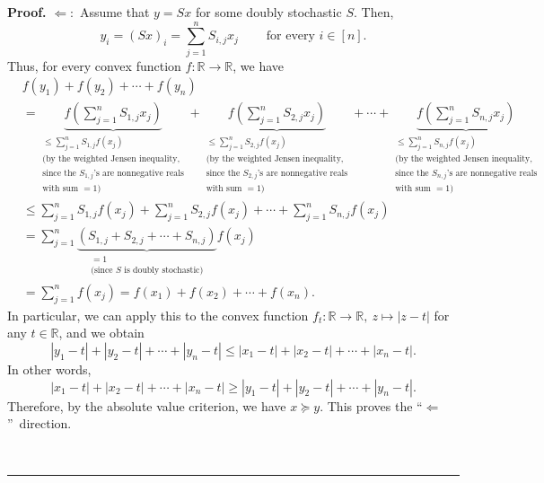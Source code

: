 \documentclass[numbers=enddot,12pt,final,onecolumn,notitlepage]{scrartcl}%
\numberwithin{exer}{subsection}
\theoremstyle{definition}
\newenvironment{proof}[1][Proof]{\noindent\textbf{#1.} }{\ \rule{0.5em}{0.5em}}
\let\sumnonlimits\sum
\renewcommand{\sum}{\sumnonlimits\limits}
\begin{document}
\begin{proof}
$\Longleftarrow:$ Assume that $y=Sx$ for some doubly stochastic $S$. Then,%
\[
y_{i}=\left(  Sx\right)  _{i}=\sum_{j=1}^{n}S_{i,j}x_{j}%
\ \ \ \ \ \ \ \ \ \ \text{for every }i\in\left[  n\right]  .
\]
Thus, for every convex function $f:\mathbb{R}\rightarrow\mathbb{R}$, we have%
\begin{align*}
& f\left(  y_{1}\right)  +f\left(  y_{2}\right)  +\cdots+f\left(
y_{n}\right)  \\
& =\underbrace{f\left(  \sum_{j=1}^{n}S_{1,j}x_{j}\right)  }_{\substack{\leq
\sum_{j=1}^{n}S_{1,j}f\left(  x_{j}\right)  \\\text{(by the weighted Jensen
inequality,}\\\text{since the }S_{1,j}\text{'s are nonnegative reals}%
\\\text{with sum }=1\text{)}}}+\underbrace{f\left(  \sum_{j=1}^{n}S_{2,j}%
x_{j}\right)  }_{\substack{\leq\sum_{j=1}^{n}S_{2,j}f\left(  x_{j}\right)
\\\text{(by the weighted Jensen inequality,}\\\text{since the }S_{2,j}\text{'s
are nonnegative reals}\\\text{with sum }=1\text{)}}}+\cdots
+\underbrace{f\left(  \sum_{j=1}^{n}S_{n,j}x_{j}\right)  }_{\substack{\leq
\sum_{j=1}^{n}S_{n,j}f\left(  x_{j}\right)  \\\text{(by the weighted Jensen
inequality,}\\\text{since the }S_{n,j}\text{'s are nonnegative reals}%
\\\text{with sum }=1\text{)}}}\\
& \leq\sum_{j=1}^{n}S_{1,j}f\left(  x_{j}\right)  +\sum_{j=1}^{n}%
S_{2,j}f\left(  x_{j}\right)  +\cdots+\sum_{j=1}^{n}S_{n,j}f\left(
x_{j}\right)  \\
& =\sum_{j=1}^{n}\underbrace{\left(  S_{1,j}+S_{2,j}+\cdots+S_{n,j}\right)
}_{\substack{=1\\\text{(since }S\text{ is doubly stochastic)}}}f\left(
x_{j}\right)  \\
& =\sum_{j=1}^{n}f\left(  x_{j}\right)  =f\left(  x_{1}\right)  +f\left(
x_{2}\right)  +\cdots+f\left(  x_{n}\right)  .
\end{align*}
In particular, we can apply this to the convex function $f_{t}:\mathbb{R}%
\rightarrow\mathbb{R},\ z\mapsto\left\vert z-t\right\vert $ for any
$t\in\mathbb{R}$, and we obtain%
\[
\left\vert y_{1}-t\right\vert +\left\vert y_{2}-t\right\vert +\cdots
+\left\vert y_{n}-t\right\vert \leq\left\vert x_{1}-t\right\vert +\left\vert
x_{2}-t\right\vert +\cdots+\left\vert x_{n}-t\right\vert .
\]
In other words,%
\[
\left\vert x_{1}-t\right\vert +\left\vert x_{2}-t\right\vert +\cdots
+\left\vert x_{n}-t\right\vert \geq\left\vert y_{1}-t\right\vert +\left\vert
y_{2}-t\right\vert +\cdots+\left\vert y_{n}-t\right\vert .
\]
Therefore, by the absolute value criterion, we have $x\succcurlyeq y$. This
proves the \textquotedblleft$\Longleftarrow$\textquotedblright\ direction.


\end{proof}
\end{document}
